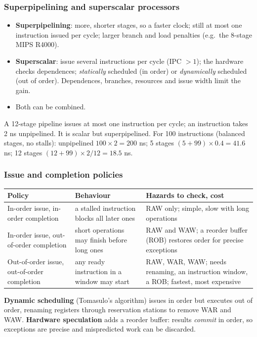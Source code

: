 \subsubsection{Superpipelining and superscalar processors}
\begin{itemize}
  \item \textbf{Superpipelining}: more, shorter stages, so a faster clock; still at
  most one instruction issued per cycle; larger branch and load penalties (e.g.\ the
  8-stage MIPS R4000).
  \item \textbf{Superscalar}: issue several instructions per cycle (IPC $>1$); the
  hardware checks dependences; \emph{statically} scheduled (in order) or
  \emph{dynamically} scheduled (out of order). Dependences, branches, resources and
  issue width limit the gain.
  \item Both can be combined.
\end{itemize}

\begin{eg}
A 12-stage pipeline issues at most one instruction per cycle; an instruction takes
2 ns unpipelined. It is scalar but superpipelined. For 100 instructions (balanced
stages, no stalls): unpipelined $100\times2=200$ ns; 5 stages
$(5+99)\times0.4=41.6$ ns; 12 stages $(12+99)\times2/12=18.5$ ns.
\end{eg}

\subsubsection{Issue and completion policies}
\begin{center}
\small
\begin{tabular}{@{}P{3.8cm}P{4.8cm}P{5.4cm}@{}}
\toprule
Policy & Behaviour & Hazards to check, cost \\
\midrule
In-order issue, in-order completion & a stalled instruction blocks all later ones & RAW only; simple, slow with long operations \\
In-order issue, out-of-order completion & short operations may finish before long ones & RAW and WAW; a reorder buffer (ROB) restores order for precise exceptions \\
Out-of-order issue, out-of-order completion & any ready instruction in a window may start & RAW, WAR, WAW; needs renaming, an instruction window, a ROB; fastest, most expensive \\
\bottomrule
\end{tabular}
\end{center}
\textbf{Dynamic scheduling} (Tomasulo's algorithm) issues in order but executes out
of order, renaming registers through reservation stations to remove WAR and WAW.
\textbf{Hardware speculation} adds a reorder buffer: results \emph{commit} in
order, so exceptions are precise and mispredicted work can be
discarded.

